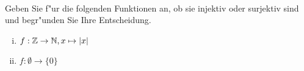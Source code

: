 


\\
Geben Sie f"ur die folgenden Funktionen an, ob sie injektiv oder surjektiv sind und begr"unden Sie Ihre Entscheidung.\\

\begin{enumerate}[(i)]
\item $f:\mathbb{Z}\to\mathbb{N}, x\mapsto |x|$
\item $f:\emptyset\to\{0\}$
\end{enumerate}

